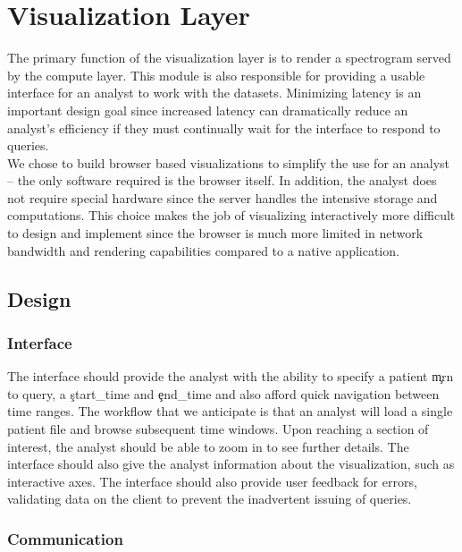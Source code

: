 \chapter{Visualization Layer}\label{viz-ch}

The primary function of the visualization layer is to render a spectrogram
served by the compute layer. This module is also responsible for providing a
usable interface for an analyst to work with the datasets.  Minimizing latency
is an important design goal since increased latency can dramatically reduce an
analyst's efficiency if they must continually wait for the interface to respond
to queries. \\

We chose to build browser based visualizations to simplify the use for an
analyst -- the only software required is the browser itself. In addition, the
analyst does not require special hardware since the server handles the
intensive storage and computations. This choice makes the job of visualizing
interactively more difficult to design and implement since the browser is much
more limited in network bandwidth and rendering capabilities compared to a
native application.

\section{Design}

\subsection{Interface}

The interface should provide the analyst with the ability to specify a patient
\c{mrn} to query, a \c{start\_time} and \c{end\_time} and also afford quick
navigation between time ranges. The workflow that we anticipate is that an
analyst will load a single patient file and browse subsequent time windows. Upon
reaching a section of interest, the analyst should be able to zoom in to see
further details. The interface should also give the analyst information about
the visualization, such as interactive axes. The interface should also provide
user feedback for errors, validating data on the client to prevent the
inadvertent issuing of queries.

\subsection{Communication}

